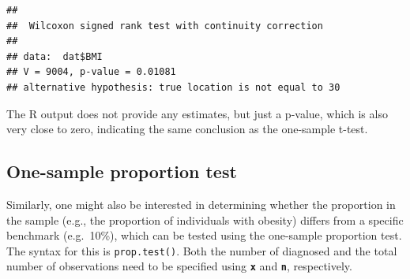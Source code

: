 \documentclass[
]{book}
\newenvironment{Shaded}{\begin{snugshade}}{\end{snugshade}}
\newcommand{\AttributeTok}[1]{\textcolor[rgb]{0.13,0.29,0.53}{#1}}
\newcommand{\DecValTok}[1]{\textcolor[rgb]{0.00,0.00,0.81}{#1}}
\newcommand{\FloatTok}[1]{\textcolor[rgb]{0.00,0.00,0.81}{#1}}
\newcommand{\FunctionTok}[1]{\textcolor[rgb]{0.13,0.29,0.53}{\textbf{#1}}}
\newcommand{\NormalTok}[1]{#1}
\newcommand{\OtherTok}[1]{\textcolor[rgb]{0.56,0.35,0.01}{#1}}
\newcommand{\SpecialCharTok}[1]{\textcolor[rgb]{0.81,0.36,0.00}{\textbf{#1}}}
\begin{document}
\begin{Shaded}
\end{Shaded}

\begin{verbatim}
## 
##  Wilcoxon signed rank test with continuity correction
## 
## data:  dat$BMI
## V = 9004, p-value = 0.01081
## alternative hypothesis: true location is not equal to 30
\end{verbatim}

The R output does not provide any estimates, but just a p-value, which is also very close to zero, indicating the same conclusion as the one-sample t-test.

\subsection{One-sample proportion test}\label{sec:oneSamplePropTest}

Similarly, one might also be interested in determining whether the proportion in the sample (e.g., the proportion of individuals with obesity) differs from a specific benchmark (e.g.~10\%), which can be tested using the one-sample proportion test. The syntax for this is \texttt{prop.test()}. Both the number of diagnosed and the total number of observations need to be specified using \textbf{\texttt{x}} and \textbf{\texttt{n}}, respectively.

\begin{Shaded}
\end{Shaded}
\end{document}
